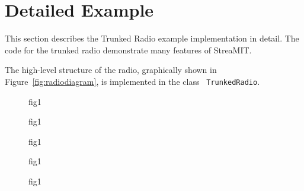 \section{Detailed Example}
This section describes the Trunked Radio example implementation in
detail. The code for the trunked radio demonstrate many features of
StreaMIT. 

The high-level structure of the radio, graphically shown in
Figure~\ref{fig:radiodiagram}, is implemented in the class {\tt
TrunkedRadio}.




\begin{figure}
\centering
{}
\caption{ fig1}
\label{fig:data_structs}
\end{figure}

\begin{figure*}
\centering
{}
\caption{ fig1}
\label{fig:data_structs}
\end{figure*}

\begin{figure*}
\centering
{}
\caption{ fig1}
\label{fig:data_structs}
\end{figure*}

\begin{figure}
\centering
{}
\caption{ fig1}
\label{fig:data_structs}
\end{figure}

\begin{figure*}
\centering
{}
\caption{ fig1}
\label{fig:data_structs}
\end{figure*}


\newpage

